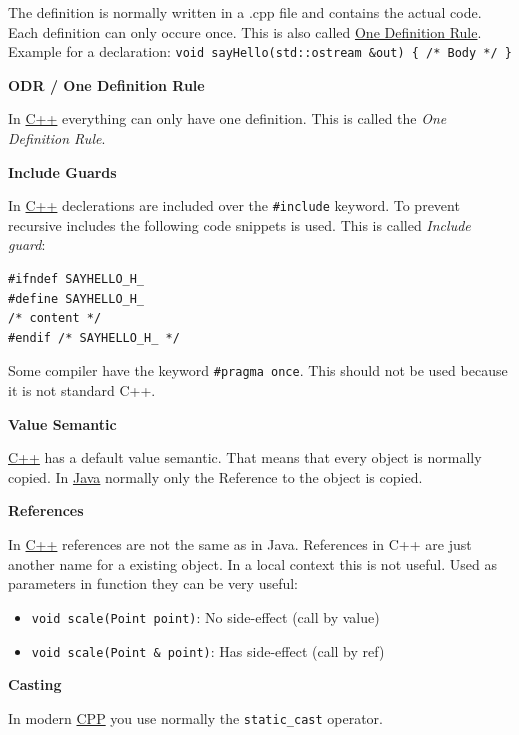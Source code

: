 \documentclass[11pt,twoside,landscape]{article}
\begin{document}
\begin{multicols}{3}
The definition is normally written in a .cpp file and contains the actual code.
Each definition can only occure once.
This is also called \href{../../../roam/20210920104915-one_definition_rule.org}{One Definition Rule}.
Example for a declaration: \texttt{void sayHello(std::ostream \&out) \{ /* Body */ \}}

\textbf{ODR / One Definition Rule}

In \href{../../../roam/20210920103243-c.org}{C++} everything can only have one definition.
This is called the \emph{One Definition Rule}.

\textbf{Include Guards}

In \href{../../../roam/20210920103243-c.org}{C++} declerations are included over the \texttt{\#include} keyword.
To prevent recursive includes the following code snippets is used.
This is called \emph{Include guard}:
\lstset{language=c++,label= ,caption= ,captionpos=b,numbers=none}
\begin{lstlisting}
#ifndef SAYHELLO_H_
#define SAYHELLO_H_
/* content */
#endif /* SAYHELLO_H_ */
\end{lstlisting}

Some compiler have the keyword \texttt{\#pragma once}.
This should not be used because it is not standard C++.

\textbf{Value Semantic}

\href{../../../roam/20210920103243-c.org}{C++} has a default value semantic.
That means that every object is normally copied.
In \href{../../../roam/20201116150053-java.org}{Java} normally only the Reference to the object is copied.

\textbf{References}

In \href{../../../roam/20210920103243-c.org}{C++} references are not the same as in Java.
References in C++ are just another name for a existing object.
In a local context this is not useful.
Used as parameters in function they can be very useful:

\begin{itemize}
\item \texttt{void scale(Point point)}: No side-effect (call by value)
\item \texttt{void scale(Point \& point)}: Has side-effect (call by ref)
\end{itemize}


\textbf{Casting}

In modern \href{../../../roam/20210920103243-c.org}{CPP} you use normally the \texttt{static\_cast} operator.


\end{multicols}
\end{document}
